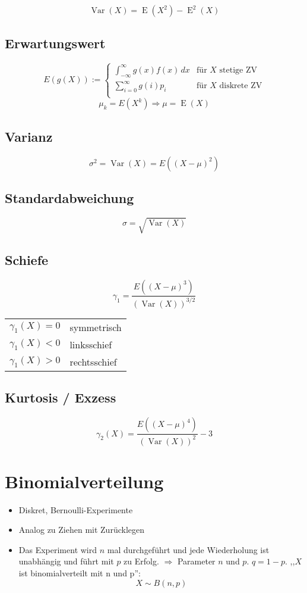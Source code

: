 \documentclass[a4paper,twocolumn]{article}
\DeclareMathOperator{\Var}{Var}
\DeclareMathOperator{\E}{E}
\begin{document}
\[
    \Var{(X)} = \E(X^2) - \E^2(X)
\]

\subsection{Erwartungswert}
\[
    E(g(X)) := \left\{\begin{array}{ll}
        \int_{-\infty}^\infty g(x) f(x)\,dx & \text{für $X$ stetige ZV} \\
        \sum_{i=0}^\infty g(i) p_i & \text{für $X$ diskrete ZV} \\
    \end{array}\right.
\] \[
    \mu_k = E(X^k) \Rightarrow \mu = \E(X)
\]

\subsection{Varianz}
\[
    \sigma^2 = \Var(X) = E((X - \mu)^2)
\]

\subsection{Standardabweichung}
\[
    \sigma = \sqrt{\Var(X)}
\]

\subsection{Schiefe}
\[
    \gamma_1 = \frac{E((X - \mu)^3)}{(\Var(X))^{3/2}}
\]
\begin{center}
  \begin{tabular}{ll}
    $\gamma_1(X) = 0$ & symmetrisch \\
    $\gamma_1(X) < 0$ & linksschief \\
    $\gamma_1(X) > 0$ & rechtsschief \\
  \end{tabular}
\end{center}

\subsection{Kurtosis / Exzess}
\[
    \gamma_2(X) = \frac{E((X - \mu)^4)}{(\Var(X))^2} - 3
\]

\section{Binomialverteilung}

\begin{itemize}
  \item Diskret, Bernoulli-Experimente
  \item Analog zu Ziehen mit Zurücklegen
  \item Das Experiment wird $n$ mal durchgeführt und jede Wiederholung ist
        unabhängig und führt mit $p$ zu Erfolg. $\Rightarrow$ Parameter $n$
        und $p$. $q = 1-p$. ,,$X$ ist binomialverteilt mit n und p'':
        \[
            X \sim B(n, p)
        \]
\end{itemize}
\end{document}
